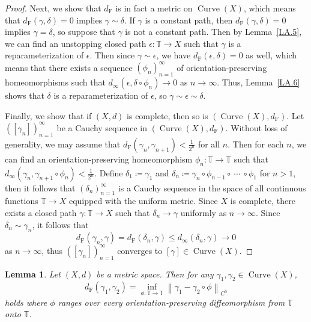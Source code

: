 \documentclass[reqno,centertags,12pt]{amsart}
\newtheorem{lemma}[theorem]{Lemma}
\theoremstyle{definition}
\numberwithin{equation}{section}
\newcommand{\norm}[1]{\left\|#1\right\|}
\newcommand{\seq}[1]{\left( #1 \right)}
\newcommand{\bbT}{{\mathbb{T}}}
\begin{document}
\begin{proof}
	Next, we show that $d_{\mathrm{F}}$ is in fact a metric on $\operatorname{Curve}(X)$,
	which means that $d_{\mathrm{F}}(\gamma,\delta) = 0$ implies $\gamma\sim \delta$.
	If $\gamma$ is a constant path, then $d_{\mathrm{F}}(\gamma,\delta) = 0$ implies
	$\gamma=\delta$, so suppose that $\gamma$ is not a constant path. Then
	by Lemma~\ref{LA.5}, we can find an
	unstopping closed path $\epsilon\colon\bbT\to X$ such that $\gamma$
	is a reparameterization of $\epsilon$. Then since $\gamma\sim \epsilon$, we have
	$d_{\mathrm{F}}(\epsilon,\delta) = 0$ as well, which means that
	there exists a sequence $\seq{\phi_{n}}_{n=1}^{\infty}$ of orientation-preserving
	homeomorphisms such that $d_{\infty}(\epsilon,\delta\circ\phi_{n})\to 0$ as $n\to\infty$.
	Thus, Lemma~\ref{LA.6}
	shows that $\delta$ is a reparameterization of $\epsilon$, so
	$\gamma\sim \epsilon\sim \delta$.

	Finally, we show that if $(X,d)$ is complete, then so is
	$(\operatorname{Curve}(X),d_{\mathrm{F}})$. Let $\seq{[\gamma_{n}]}_{n=1}^{\infty}$
	be a Cauchy sequence in $(\operatorname{Curve}(X),d_{\mathrm{F}})$.
	Without loss of generality, we may assume that
	$d_{\mathrm{F}}(\gamma_{n},\gamma_{n+1})<\frac{1}{2^{n}}$ for all $n$. Then
	for each $n$, we can find an orientation-preserving homeomorphism
	$\phi_{n}\colon\bbT\to\bbT$ such that
	$d_{\infty}(\gamma_{n},\gamma_{n+1}\circ\phi_{n})<\frac{1}{2^{n}}$.
	Define $\delta_{1}\coloneqq \gamma_{1}$ and
	$\delta_{n}\coloneqq \gamma_{n}\circ\phi_{n-1}\circ\ \cdots\ \circ\phi_{1}$ for $n>1$,
	then it follows that $\seq{\delta_{n}}_{n=1}^{\infty}$ is a Cauchy sequence
	in the space of all continuous functions $\bbT\to X$ equipped with the
	uniform metric. Since $X$ is complete, there exists a closed path
	$\gamma\colon\bbT\to X$ such that $\delta_{n}\to \gamma$ uniformly as $n\to\infty$.
	Since $\delta_{n}\sim \gamma_{n}$, it follows that
	\[
		d_{\mathrm{F}}(\gamma_{n},\gamma) = d_{\mathrm{F}}(\delta_{n},\gamma)
		\leq d_{\infty}(\delta_{n},\gamma) \to 0
	\]
	as $n\to\infty$, thus $\seq{[\gamma_{n}]}_{n=1}^{\infty}$ converges to
	$[\gamma]\in\operatorname{Curve}(X)$.
\end{proof}

\begin{lemma}\label{LA.12}
    Let $(X,d)$ be a metric space. Then for any
    $\gamma_{1},\gamma_{2}\in \operatorname{Curve}(X)$,
    \[
        d_{\mathrm{F}}(\gamma_{1},\gamma_{2}) =
        \inf_{\phi\colon\bbT\to\bbT}\norm{\gamma_{1} - \gamma_{2}\circ\phi}_{C^{0}}
    \]
    holds where $\phi$ ranges over every orientation-preserving
    \emph{diffeomorphism} from $\bbT$ onto $\bbT$.
\end{lemma}
\end{document}
